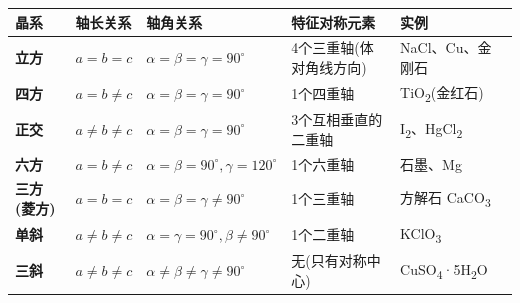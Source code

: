 {\def\LTcaptype{none} %
\begin{longtable}[]{@{}
  >{\raggedright\arraybackslash}p{}
  >{\raggedright\arraybackslash}p{}
  >{\raggedright\arraybackslash}p{}
  >{\raggedright\arraybackslash}p{}
  >{\raggedright\arraybackslash}p{}@{}}
\toprule\noalign{}
\begin{minipage}[b]{\linewidth}\raggedright
晶系
\end{minipage} & \begin{minipage}[b]{\linewidth}\raggedright
轴长关系
\end{minipage} & \begin{minipage}[b]{\linewidth}\raggedright
轴角关系
\end{minipage} & \begin{minipage}[b]{\linewidth}\raggedright
特征对称元素
\end{minipage} & \begin{minipage}[b]{\linewidth}\raggedright
实例
\end{minipage} \\
\midrule\noalign{}
\endhead
\bottomrule\noalign{}
\endlastfoot
\textbf{立方} & \(a = b = c\) & \(\alpha = \beta = \gamma = 90^\circ\) & 4个三重轴(体对角线方向) & NaCl、Cu、金刚石 \\
\textbf{四方} & \(a = b \neq c\) & \(\alpha = \beta = \gamma = 90^\circ\) & 1个四重轴 & TiO\textsubscript{2}(金红石) \\
\textbf{正交} & \(a \neq b \neq c\) & \(\alpha = \beta = \gamma = 90^\circ\) & 3个互相垂直的二重轴 & I\textsubscript{2}、HgCl\textsubscript{2} \\
\textbf{六方} & \(a = b \neq c\) & \(\alpha = \beta = 90^\circ, \gamma = 120^\circ\) & 1个六重轴 & 石墨、Mg \\
\textbf{三方(菱方)} & \(a = b = c\) & \(\alpha = \beta = \gamma \neq 90^\circ\) & 1个三重轴 & 方解石 CaCO\textsubscript{3} \\
\textbf{单斜} & \(a \neq b \neq c\) & \(\alpha = \gamma = 90^\circ, \beta \neq 90^\circ\) & 1个二重轴 & KClO\textsubscript{3} \\
\textbf{三斜} & \(a \neq b \neq c\) & \(\alpha \neq \beta \neq \gamma \neq 90^\circ\) & 无(只有对称中心) & CuSO\textsubscript{4}·5H\textsubscript{2}O \\
\end{longtable}
}

